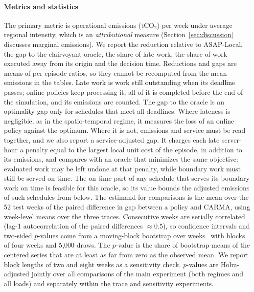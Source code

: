 \paragraph{Metrics and statistics} The primary metric is operational emissions (tCO$_2$) per week under average regional intensity, which is an \emph{attributional} measure (Section~\ref{sec:discussion} discusses marginal emissions). We report the reduction relative to ASAP-Local, the gap to the clairvoyant oracle, the share of late work, the share of work executed away from its origin and the decision time. Reductions and gaps are means of per-episode ratios, so they cannot be recomputed from the mean emissions in the tables. Late work is work still outstanding when its deadline passes; online policies keep processing it, all of it is completed before the end of the simulation, and its emissions are counted. The gap to the oracle is an optimality gap only for schedules that meet all deadlines. Where lateness is negligible, as in the spatio-temporal regime, it measures the loss of an online policy against the optimum. Where it is not, emissions and service must be read together, and we also report a service-adjusted gap. It charges each late server-hour a penalty equal to the largest local unit cost of the episode, in addition to its emissions, and compares with an oracle that minimizes the same objective: evaluated work may be left undone at that penalty, while boundary work must still be served on time. The on-time part of any schedule that serves its boundary work on time is feasible for this oracle, so its value bounds the adjusted emissions of such schedules from below. The estimand for comparisons is the mean over the 52 test weeks of the paired difference in gap between a policy and CARMA, using week-level means over the three traces. Consecutive weeks are serially correlated (lag-1 autocorrelation of the paired differences $\approx0.5$), so confidence intervals and two-sided $p$-values come from a moving-block bootstrap over weeks~\cite{kunsch1989jackknife} with blocks of four weeks and 5{,}000 draws. The $p$-value is the share of bootstrap means of the centered series that are at least as far from zero as the observed mean. We report block lengths of two and eight weeks as a sensitivity check. $p$-values are Holm-adjusted jointly over all comparisons of the main experiment (both regimes and all loads) and separately within the trace and sensitivity experiments.
